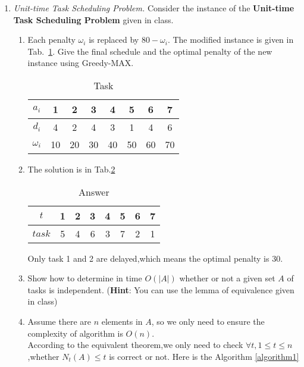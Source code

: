 \documentclass[12pt,a4paper]{article}
\makeatletter
\newtheorem*{solution}{Solution}
\theoremstyle{definition}
\renewenvironment{solution}[1][Solution] {\par\pushQED{\qed}\normalfont\topsep6\p@\@plus6\p@\relax\trivlist\item[\hskip\labelsep\bfseries#1\@addpunct{.}]\ignorespaces}{\popQED\endtrivlist\@endpefalse} \makeatother
\makeatother
\begin{document}
\begin{enumerate}
\begin{enumerate}
\end{enumerate}
\item \textit{Unit-time Task Scheduling Problem.} Consider the instance of the \textbf{Unit-time Task Scheduling Problem} given in class. 
    \begin{enumerate}
        \item Each penalty $\omega_{i}$ is replaced by $80-\omega_{i}$. The modified instance is given in Tab.~\ref{tab:1}. Give the final schedule and the optimal penalty of the new instance using Greedy-MAX.
		\begin{table}[H]
			\setlength{\abovecaptionskip}{0.cm}
			\setlength{\belowcaptionskip}{0.5cm}
			\centering
			\caption{Task}
			\label{tab:1}			
			\begin{tabular}{|c|ccccccc|}
				\hline
				$ a_{i} $&1&2&3&4&5&6&7\\
				\hline
				$ d_{i} $&4&2&4&3&1&4&6\\
                \hline
                $ \omega_{i} $&10&20&30&40&50&60&70\\
				\hline
			\end{tabular}
		\end{table}
	       \begin{solution}
	       The solution is in Tab.\ref{tab:2}
	           \begin{table}[H]
			\setlength{\abovecaptionskip}{0.cm}
			\setlength{\belowcaptionskip}{0.5cm}
			\centering
			\caption{Answer}
			\label{tab:2}			
			\begin{tabular}{|c|ccccccc|}
				\hline
				$ t $&1&2&3&4&5&6&7\\
                \hline
                $ task $&5&4&6&3&7&2&1\\
				\hline
			\end{tabular}
		\end{table} 
		Only task 1 and 2 are delayed,which means the optimal penalty is 30.
	        \end{solution}
        \item Show how to determine in time $O(|A|)$ whether or not a given set $A$ of tasks is independent. (\textbf{Hint}: You can use the lemma of equivalence given in class)
 	    \begin{solution}
                Assume there are $n$ elements in $A$, so we only need to ensure the complexity of algorithm is $O(n)$.\\
                According to the equivalent theorem,we only need to check $\forall t,1\le t \le n$,whether $N_t(A)\le t$ is correct or not. Here is the Algorithm \ref{algorithm1}\\
                \begin{algorithm}[H]
        

\end{algorithm}
\end{solution}
\end{enumerate}
\end{enumerate}
\end{document}

